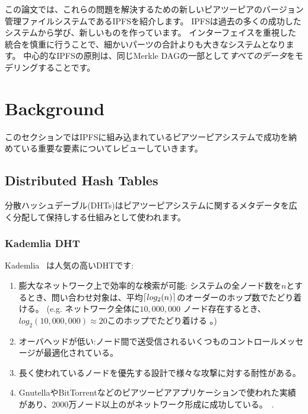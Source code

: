 \documentclass{sig-alternate}
\DeclarePairedDelimiter{\ceil}{\lceil}{\rceil}
\begin{document}
この論文では、これらの問題を解決するための新しいピアツーピアのバージョン管理ファイルシステムであるIPFSを紹介します。 IPFSは過去の多くの成功したシステムから学び、新しいものを作っています。 インターフェイスを重視した統合を慎重に行うことで、細かいパーツの合計よりも大きなシステムとなります。 中心的なIPFSの原則は、同じMerkle DAGの一部として\textit {すべてのデータ}をモデリングすることです。



\section{Background}
このセクションではIPFSに組み込まれているピアツーピアシステムで成功を納めている重要な要素についてレビューしていきます。
\subsection{Distributed Hash Tables}
分散ハッシュデーブル(DHTs)はピアツーピアシステムに関するメタデータを広く分配して保持しする仕組みとして使われます。
\subsubsection{Kademlia DHT}

Kademlia~\cite{maymounkov02} は人気の高いDHTです:

\begin{enumerate}

  \item 膨大なネットワーク上で効率的な検索が可能:
        システムの全ノード数を$n$とするとき、問い合わせ対象は、平均$\ceil{log_2 (n)}$のオーダーのホップ数でたどり着ける。
        (e.g. ネットワーク全体に$10,000,000$ ノード存在するとき、$log_2(10,000,000)\approx 20$このホップでたどり着ける 。)

  \item オーバヘッドが低い:ノード間で送受信されるいくつものコントロールメッセージが最適化されている。

  \item 長く使われているノードを優先する設計で様々な攻撃に対する耐性がある。

  \item GnutellaやBitTorrentなどのピアツーピアアプリケーションで使われた実績があり、2000万ノード以上のがネットワーク形成に成功している。~\cite{wang13}.

 \end{enumerate}
\end{document}
